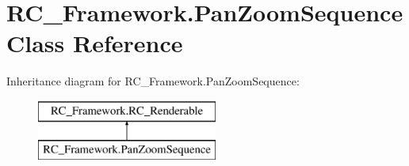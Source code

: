 \hypertarget{class_r_c___framework_1_1_pan_zoom_sequence}{}\section{R\+C\+\_\+\+Framework.\+Pan\+Zoom\+Sequence Class Reference}
\label{class_r_c___framework_1_1_pan_zoom_sequence}
Inheritance diagram for R\+C\+\_\+\+Framework.\+Pan\+Zoom\+Sequence\+:\begin{figure}[H]
\begin{center}
\leavevmode
\includegraphics[height=2.000000cm]{class_r_c___framework_1_1_pan_zoom_sequence}
\end{center}
\end{figure}

